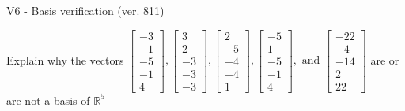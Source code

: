\begin{exercise}
  \begin{exerciseTitle}V6 - Basis verification (ver. 811)\end{exerciseTitle}
  \begin{exerciseStatement}
    Explain why the vectors \(\left[\begin{array}{r}
-3 \\
-1 \\
-5 \\
-1 \\
4
\end{array}\right] , \left[\begin{array}{r}
3 \\
2 \\
-3 \\
-3 \\
-3
\end{array}\right] , \left[\begin{array}{r}
2 \\
-5 \\
-4 \\
-4 \\
1
\end{array}\right] , \left[\begin{array}{r}
-5 \\
1 \\
-5 \\
-1 \\
4
\end{array}\right] , \text{ and } \left[\begin{array}{r}
-22 \\
-4 \\
-14 \\
2 \\
22
\end{array}\right]\) are or are not a basis of \(\mathbb{R}^5\)	



\end{exerciseStatement}
\end{exercise}

